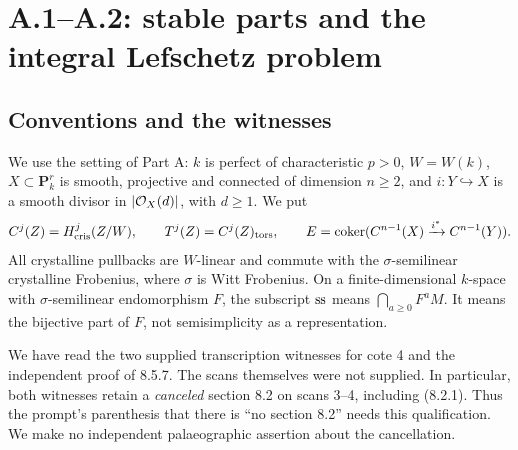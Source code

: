 \section{A.1--A.2: stable parts and the integral Lefschetz problem}
\label{sec:A-foundations}

\subsection{Conventions and the witnesses}
We use the setting of Part A: $k$ is perfect of characteristic $p>0$,
$W=W(k)$, $X\subset\mathbf P^r_k$ is smooth, projective and connected of
dimension $n\geq2$, and $i:Y\hookrightarrow X$ is a smooth divisor in
$|\OO_X(d)|$, with $d\geq1$.  We put
\[
 C^j(Z)=H^j_{\cris}(Z/W),\qquad T^j(Z)=C^j(Z)_{\tors},\qquad
 E=\coker(C^{n-1}(X)\xrightarrow{i^*}C^{n-1}(Y)).
\]
All crystalline pullbacks are $W$-linear and commute with the
$\sigma$-semilinear crystalline Frobenius, where $\sigma$ is Witt
Frobenius.  On a finite-dimensional $k$-space with $\sigma$-semilinear
endomorphism $F$, the subscript $\ss$ means $\bigcap_{a\geq0}F^aM$.
It means the bijective part of $F$, not semisimplicity as a representation.

We have read the two supplied transcription witnesses for cote 4 and the
independent proof of 8.5.7.  The scans themselves were not supplied.
In particular, both witnesses retain a \emph{canceled} section 8.2 on
scans 3--4, including (8.2.1).  Thus the prompt's parenthesis that there is
``no section 8.2'' needs this qualification.  We make no independent
palaeographic assertion about the cancellation.

